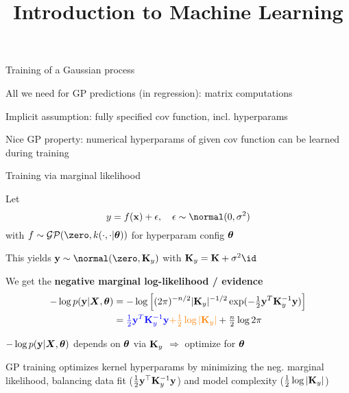 \documentclass[11pt,compress,t,notes=noshow, xcolor=table]{beamer}
\title{Introduction to Machine Learning}
\begin{document}

\begin{framei}[sep=L]{Training of a Gaussian process}
\item All we need for GP predictions (in regression): matrix computations
\item Implicit assumption: fully specified cov function, incl. hyperparams
\item Nice GP property: numerical hyperparams of given cov function can be learned during training
\end{framei}

\begin{framei}[sep=L]{Training via marginal likelihood}
\item Let $$y = \fx + \epsilon, \quad \epsilon \sim \normal(0, \sigma^2)$$
with $f \sim \mathcal{GP}(\zero, k(\cdot, \cdot | \thetav))$ for hyperparam config $\bm{\theta}$
\item This yields $\yv \sim \normal(\zero, \Ky )$ with  $\Ky = \Kmat + \sigma^2 \id$
\item We get the \textbf{negative marginal log-likelihood / evidence}
\begin{eqnarray*}
-\log p(\mathbf{y} | \bm{X}, \bm{\theta}) &= -\log \left[(2 \pi )^{-n / 2} |\mathbf{K}_y|^{-1 / 2} \exp(- \tfrac{1}{2} \mathbf{y}^T \mathbf{K}_y^{-1} \mathbf{y}) \right] \\
&= \textcolor{blue}{\tfrac{1}{2} \mathbf{y}^T \mathbf{K}_y^{-1} \mathbf{y}} \textcolor{orange}{+ \tfrac{1}{2} \log | \mathbf{K}_y |}  + \tfrac{n}{2} \log 2 \pi
\end{eqnarray*}
\item $-\log p(\mathbf{y} | \bm{X}, \bm{\theta})$ depends on $\bm{\theta}$ via $\mathbf{K}_y$ $\Rightarrow$ optimize for $\bm{\theta}$
\item GP training optimizes kernel hyperparams by minimizing the neg. marginal likelihood, balancing data fit ($\tfrac{1}{2}\mathbf{y}^\top \mathbf{K}_y^{-1}\mathbf{y}$) and model complexity ($\tfrac{1}{2}\log|\mathbf{K}_y|$)
\end{framei}
\end{document}
